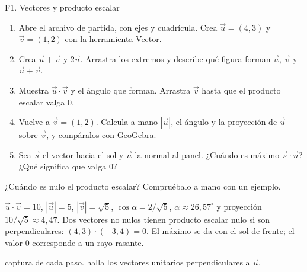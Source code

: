 \begin{tarjeta}{F1. Vectores y producto escalar}
\begin{enumerate}[leftmargin=1.5em]
  \item Abre el archivo de partida, con ejes y cuadrícula. Crea $\vec u=(4,3)$ y $\vec v=(1,2)$ con la herramienta Vector.
  \item Crea $\vec u+\vec v$ y $2\vec u$. Arrastra los extremos y describe qué figura forman $\vec u$, $\vec v$ y $\vec u+\vec v$.
  \item Muestra $\vec u\cdot\vec v$ y el ángulo que forman. Arrastra $\vec v$ hasta que el producto escalar valga 0.
  \item Vuelve a $\vec v=(1,2)$. Calcula a mano $|\vec u|$, el ángulo y la proyección de $\vec u$ sobre $\vec v$, y compáralos con GeoGebra.
  \item Sea $\vec s$ el vector hacia el sol y $\vec n$ la normal al panel. ¿Cuándo es máximo $\vec s\cdot\vec n$? ¿Qué significa que valga 0?
\end{enumerate}
 ¿Cuándo es nulo el producto escalar? Compruébalo a mano con un ejemplo.

 $\vec u\cdot\vec v=10$, $|\vec u|=5$, $|\vec v|=\sqrt5$, $\cos\alpha=2/\sqrt5$, $\alpha\approx26{,}57^\circ$ y proyección $10/\sqrt5\approx4{,}47$. Dos vectores no nulos tienen producto escalar nulo si son perpendiculares: $(4,3)\cdot(-3,4)=0$. El máximo se da con el sol de frente; el valor 0 corresponde a un rayo rasante.

 captura de cada paso.  halla los vectores unitarios perpendiculares a $\vec u$.
\end{tarjeta}


